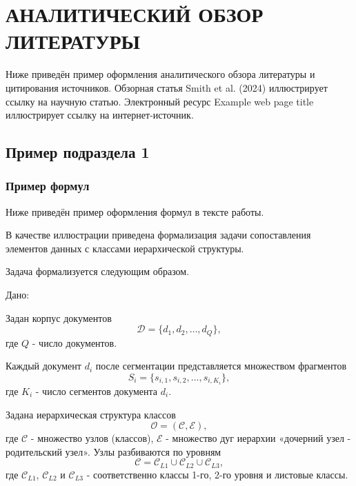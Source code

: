 \newpage
\section{АНАЛИТИЧЕСКИЙ ОБЗОР ЛИТЕРАТУРЫ}

Ниже приведён пример оформления аналитического обзора литературы и цитирования источников. Обзорная статья
Smith et al. (2024) \cite{example_article} иллюстрирует ссылку на научную статью. Электронный ресурс
Example web page title \cite{example_misc} иллюстрирует ссылку на интернет-источник.

\subsection{Пример подраздела 1}

\subsubsection{Пример формул}

Ниже приведён пример оформления формул в тексте работы.

В качестве иллюстрации приведена формализация задачи сопоставления элементов данных с классами иерархической структуры.

Задача формализуется следующим образом.

Дано:

Задан корпус документов
\begin{equation}
    \mathcal{D} = \{d_1, d_2, \ldots, d_Q\},
\end{equation}
\noindent где $Q$ - число документов.

Каждый документ $d_i$ после сегментации представляется множеством фрагментов
\begin{equation}
    S_i = \{s_{i,1}, s_{i,2}, \ldots, s_{i,K_i}\},
\end{equation}
\noindent где $K_i$ - число сегментов документа $d_i$.

Задана иерархическая структура классов
\begin{equation}
    \mathcal{O} = (\mathcal{C}, \mathcal{E}),
\end{equation}
\noindent где $\mathcal{C}$ - множество узлов (классов), $\mathcal{E}$ - множество дуг иерархии «дочерний узел -
родительский узел». Узлы разбиваются по уровням
\begin{equation}
    \mathcal{C} = \mathcal{C}_{L1} \cup \mathcal{C}_{L2} \cup \mathcal{C}_{L3},
\end{equation}
\noindent где $\mathcal{C}_{L1}$, $\mathcal{C}_{L2}$ и $\mathcal{C}_{L3}$ - соответственно классы 1-го, 2-го уровня и листовые классы.

